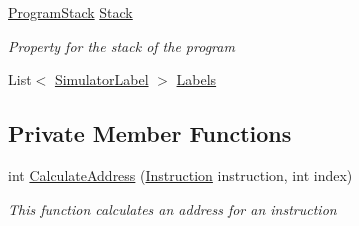 \begin{DoxyCompactItemize}
\hyperlink{class_c_p_u___o_s___simulator_1_1_c_p_u_1_1_program_stack}{Program\+Stack} \hyperlink{class_c_p_u___o_s___simulator_1_1_c_p_u_1_1_simulator_program_ac6065e57e8d108a0aefd27840f3bf01c}{Stack}
\begin{DoxyCompactList}\small\item\em Property for the stack of the program \end{DoxyCompactList}\item 
List$<$ \hyperlink{class_c_p_u___o_s___simulator_1_1_c_p_u_1_1_simulator_label}{Simulator\+Label} $>$ \hyperlink{class_c_p_u___o_s___simulator_1_1_c_p_u_1_1_simulator_program_a3b4c7a32b8f270f9c06614a6ebd52516}{Labels}
\end{DoxyCompactItemize}
\subsection*{Private Member Functions}
\begin{DoxyCompactItemize}
\item 
int \hyperlink{class_c_p_u___o_s___simulator_1_1_c_p_u_1_1_simulator_program_a6ab84d4093d03fc387e4288dfc566388}{Calculate\+Address} (\hyperlink{class_c_p_u___o_s___simulator_1_1_c_p_u_1_1_instruction}{Instruction} instruction, int index)
\begin{DoxyCompactList}\small\item\em This function calculates an address for an instruction \end{DoxyCompactList}\end{DoxyCompactItemize}
